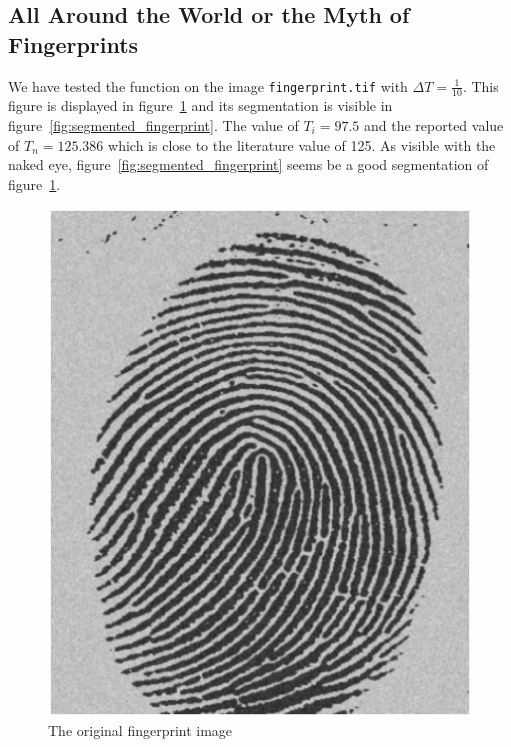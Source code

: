 \subsection{All Around the World or the Myth of Fingerprints}
We have tested the function on the image \texttt{fingerprint.tif} with \(\Delta T = \frac{1}{10}\). 
This figure is displayed in figure~\ref{fig:original_fingerprint} and its segmentation is visible in figure~\ref{fig:segmented_fingerprint}.
The value of \(T_i = 97.5\) and the reported value of \(T_n = 125.386\) which is close to the literature value of 125.
As visible with the naked eye, figure~\ref{fig:segmented_fingerprint} seems be a good segmentation of figure~\ref{fig:original_fingerprint}.
\begin{figure}[htb]
 \centering
 \includegraphics[width=\linewidth]{original_fingerprint.eps}
 \caption{The original fingerprint image}
 \label{fig:original_fingerprint}
\end{figure}

